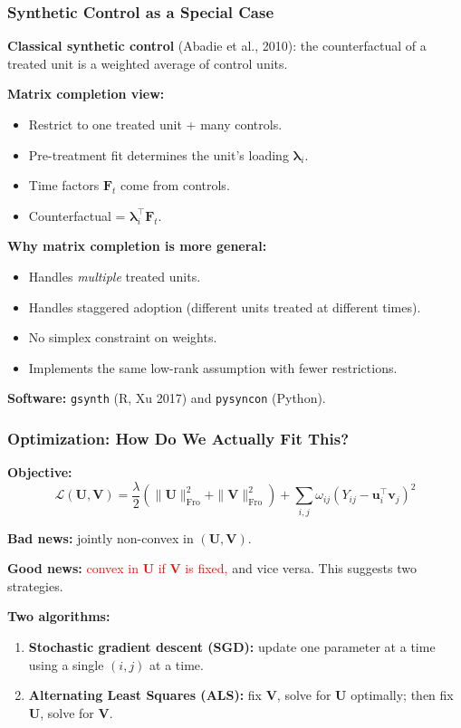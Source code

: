 \documentclass[notes,11pt, aspectratio=169]{beamer}
\newcommand{\vu}{\mathbf{u}}
\newcommand{\vv}{\mathbf{v}}
\newcommand{\vU}{\mathbf{U}}
\newcommand{\vV}{\mathbf{V}}
\newcommand{\Frob}{\mathrm{Fro}}
\begin{document}
\begin{frame}
\frametitle{Synthetic Control as a Special Case}

\textbf{Classical synthetic control} (Abadie et al., 2010): the counterfactual of a treated unit is a weighted average of control units.

\vspace{8pt}
\textbf{Matrix completion view:}
\begin{itemize}
    \item Restrict to one treated unit + many controls.
    \item Pre-treatment fit determines the unit's loading $\boldsymbol\lambda_i$.
    \item Time factors $\mathbf{F}_t$ come from controls.
    \item Counterfactual = $\boldsymbol\lambda_i^\top \mathbf{F}_t$.
\end{itemize}

\vspace{8pt}
\textbf{Why matrix completion is more general:}
\begin{itemize}
    \item Handles \emph{multiple} treated units.
    \item Handles staggered adoption (different units treated at different times).
    \item No simplex constraint on weights.
    \item Implements the same low-rank assumption with fewer restrictions.
\end{itemize}

\vspace{4pt}
\textbf{Software:} \texttt{gsynth} (R, Xu 2017) and \texttt{pysyncon} (Python).
\end{frame}

\begin{frame}
\frametitle{Optimization: How Do We Actually Fit This?}

\textbf{Objective:}
\[
    \mathcal{L}(\vU, \vV) = \frac{\lambda}{2}(\|\vU\|_\Frob^2 + \|\vV\|_\Frob^2) + \sum_{i,j} \omega_{ij}(Y_{ij} - \vu_i^\top \vv_j)^2
\]

\vspace{6pt}
\textbf{Bad news:} jointly non-convex in $(\vU, \vV)$.

\vspace{4pt}
\textbf{Good news:} \textcolor{red}{convex in $\vU$ if $\vV$ is fixed,} and vice versa. This suggests two strategies.

\vspace{8pt}
\textbf{Two algorithms:}
\begin{enumerate}
    \item \textbf{Stochastic gradient descent (SGD):} update one parameter at a time using a single $(i, j)$ at a time.
    \item \textbf{Alternating Least Squares (ALS):} fix $\vV$, solve for $\vU$ optimally; then fix $\vU$, solve for $\vV$.
\end{enumerate}
\end{frame}
\end{document}
